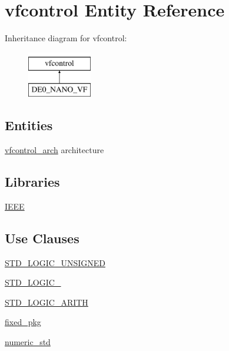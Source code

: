 \hypertarget{classvfcontrol}{}\section{vfcontrol Entity Reference}
\label{classvfcontrol}
Inheritance diagram for vfcontrol\+:\begin{figure}[H]
\begin{center}
\leavevmode
\includegraphics[height=2.000000cm]{classvfcontrol}
\end{center}
\end{figure}
\subsection*{Entities}
\begin{DoxyCompactItemize}
\item 
\hyperlink{classvfcontrol_1_1vfcontrol__arch}{vfcontrol\+\_\+arch} architecture
\end{DoxyCompactItemize}
\subsection*{Libraries}
 \begin{DoxyCompactItemize}
\item 
\hyperlink{classvfcontrol_ae4f03c286607f3181e16b9aa12d0c6d4}{I\+E\+E\+E} 
\end{DoxyCompactItemize}
\subsection*{Use Clauses}
 \begin{DoxyCompactItemize}
\item 
\hyperlink{classvfcontrol_a241c3e72dd8024cc8ae831b1b2aed7db}{S\+T\+D\+\_\+\+L\+O\+G\+I\+C\+\_\+\+U\+N\+S\+I\+G\+N\+E\+D}   
\item 
\hyperlink{classvfcontrol_aa4b2b25246a821511120e3149b003563}{S\+T\+D\+\_\+\+L\+O\+G\+I\+C\+\_}   
\item 
\hyperlink{classvfcontrol_a5d8c1f7c620a51582be96d2a58d40293}{S\+T\+D\+\_\+\+L\+O\+G\+I\+C\+\_\+\+A\+R\+I\+T\+H}   
\item 
\hyperlink{classvfcontrol_aad86249c80e8c1e7ee1c4748aba748e3}{fixed\+\_\+pkg}   
\item 
\hyperlink{classvfcontrol_a2edc34402b573437d5f25fa90ba4013e}{numeric\+\_\+std}   
\end{DoxyCompactItemize}
